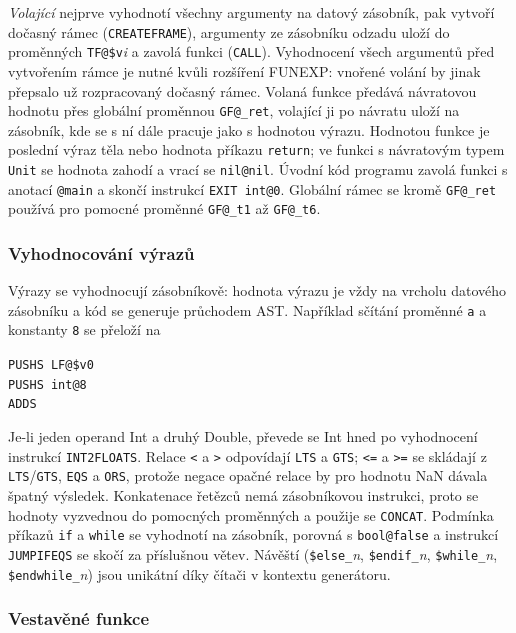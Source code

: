 \documentclass[11pt]{article}
\newcommand{\ic}[1]{\texttt{#1}}                     %
\begin{document}
\emph{Volající} nejprve vyhodnotí všechny argumenty na datový zásobník, pak vytvoří dočasný rámec (\ic{CREATEFRAME}), argumenty ze zásobníku odzadu uloží do proměnných \ic{TF@\$v}\textit{i} a zavolá funkci (\ic{CALL}). Vyhodnocení všech argumentů před vytvořením rámce je nutné kvůli rozšíření FUNEXP: vnořené volání by jinak přepsalo už rozpracovaný dočasný rámec. Volaná funkce předává návratovou hodnotu přes globální proměnnou \ic{GF@\_ret}, volající ji po návratu uloží na zásobník, kde se s ní dále pracuje jako s hodnotou výrazu. Hodnotou funkce je poslední výraz těla nebo hodnota příkazu \texttt{return}; ve funkci s návratovým typem \texttt{Unit} se hodnota zahodí a vrací se \ic{nil@nil}. Úvodní kód programu zavolá funkci s anotací \ic{@main} a skončí instrukcí \ic{EXIT int@0}. Globální rámec se kromě \ic{GF@\_ret} používá pro pomocné proměnné \ic{GF@\_t1} až \ic{GF@\_t6}.

\subsubsection{Vyhodnocování výrazů}

Výrazy se vyhodnocují zásobníkově: hodnota výrazu je vždy na vrcholu datového zásobníku a kód se generuje průchodem AST. Například sčítání proměnné \texttt{a} a konstanty \texttt{8} se přeloží na

\begin{center}
\texttt{PUSHS LF@\$v0\\PUSHS int@8\\ADDS}
\end{center}

Je-li jeden operand Int a druhý Double, převede se Int hned po vyhodnocení instrukcí \ic{INT2FLOATS}. Relace \texttt{<} a \texttt{>} odpovídají \ic{LTS} a \ic{GTS}; \texttt{<=} a \texttt{>=} se skládají z \ic{LTS}/\ic{GTS}, \ic{EQS} a \ic{ORS}, protože negace opačné relace by pro hodnotu NaN dávala špatný výsledek. Konkatenace řetězců nemá zásobníkovou instrukci, proto se hodnoty vyzvednou do pomocných proměnných a použije se \ic{CONCAT}. Podmínka příkazů \texttt{if} a \texttt{while} se vyhodnotí na zásobník, porovná s \ic{bool@false} a instrukcí \ic{JUMPIFEQS} se skočí za příslušnou větev. Návěští (\ic{\$else\_}\textit{n}, \ic{\$endif\_}\textit{n}, \ic{\$while\_}\textit{n}, \ic{\$endwhile\_}\textit{n}) jsou unikátní díky čítači v kontextu generátoru.

\subsubsection{Vestavěné funkce}
\end{document}
